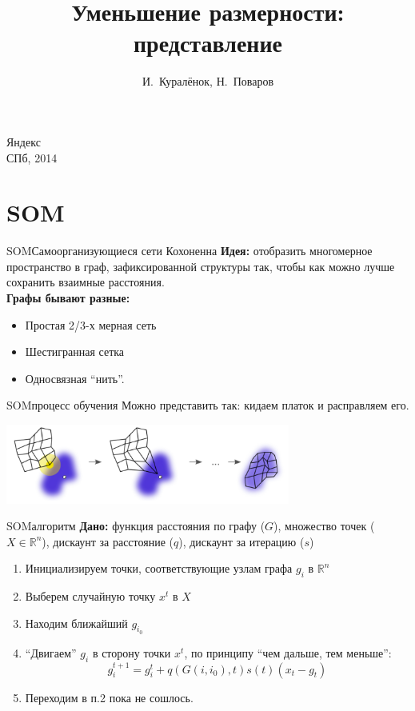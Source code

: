 \documentclass[14pt, fleqn, xcolor={dvipsnames, table}]{beamer}
\title{Уменьшение размерности: представление\\\small{}}
\author[]{\small{%
И.~Куралёнок,
Н.~Поваров}}
\date{}
\begin{document}
\begin{frame}
\maketitle
\small
\begin{center}
\vspace{-60pt}
\normalsize {\color{red}Я}ндекс \\
\vspace{80pt}
\footnotesize СПб, 2014
\end{center}
\end{frame}
\section{SOM}

\begin{frame}{SOM}{Самоорганизующиеся сети Кохоненна}
\textbf{Идея:} отобразить многомерное пространство в граф, зафиксированной структуры так, чтобы как можно лучше сохранить взаимные расстояния. \\
\textbf{Графы бывают разные:}
\begin{itemize}
  \item Простая 2/3-х мерная сеть
  \item Шестигранная сетка
  \item Односвязная “нить”.
\end{itemize}
\end{frame}

\begin{frame}{SOM}{процесс обучения}
Можно представить так: кидаем платок и расправляем его.
\begin{center}\includegraphics[width=0.7\textwidth]{SOM.png}\end{center}
\end{frame}

\begin{frame}{SOM}{алгоритм}
\textbf{Дано:} функция расстояния по графу ($G$), множество точек ($X \in \mathbb{R}^n$), дискаунт за расстояние ($q$), дискаунт за итерацию ($s$) 
\begin{enumerate}
  \item Инициализируем точки, соответствующие узлам графа $g_i$ в $\mathbb{R}^n$
  \item Выберем случайную точку $x^t$ в $X$
  \item Находим ближайший $g_{i_0}$
  \item ``Двигаем'' $g_i$ в сторону точки $x^t$, по принципу ``чем дальше, тем меньше'':
  $$
    g_i^{t+1} = g_i^t + q(G(i, i_0), t)s(t)(x_t - g_t)
  $$
  \item Переходим в п.2 пока не сошлось.
\end{enumerate}
\end{frame}
\end{document}
